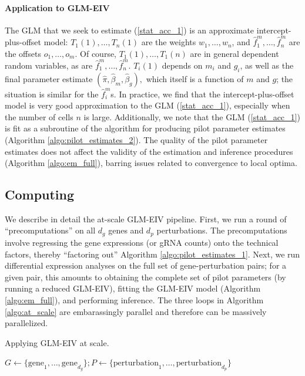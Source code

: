 \documentclass[12pt]{article}
\begin{document}
\begin{appendices}
\begin{refsection}
		\paragraph{Application to GLM-EIV}
		The GLM that we seek to estimate (\ref{stat_acc_1}) is an approximate intercept-plus-offset model: $T_1(1), \dots, T_n(1)$ are the weights $w_1,\dots, w_n$, and $\hat{f}^m_1, \dots, \hat{f}^m_n$ are the offsets $o_1, \dots, o_m$. Of course, $T_1(1), \dots, T_1(n)$ are in general dependent random variables, as are $\hat{f}^m_1, \dots, \hat{f}^m_n.$ $T_i(1)$ depends on $m_i$ and $g_i$, as well as the final parameter estimate $(\hat{\pi}, \hat{\beta}_m, \hat{\beta}_g),$ which itself is a function of $m$ and $g$; the situation is similar for the $\hat{f}^m_i$s. In practice, we find that the intercept-plus-offset model is very good approximation to the GLM (\ref{stat_acc_1}), especially when the number of cells $n$ is large. Additionally, we note that the GLM (\ref{stat_acc_1}) is fit as a subroutine of the algorithm for producing pilot parameter estimates (Algorithm \ref{algo:pilot_estimates_2}). The quality of the pilot parameter estimates does not affect the validity of the estimation and inference procedures (Algorithm \ref{algo:em_full}), barring issues related to convergence to local optima.
		
\subsection{Computing}\label{sec:computing}

We describe in detail the at-scale GLM-EIV pipeline. First, we run a round of ``precomputations'' on all $d_g$ genes and $d_p$ perturbations. The precomputations involve regressing the gene expressions (or gRNA counts) onto the technical factors, thereby ``factoring out'' Algorithm \ref{algo:pilot_estimates_1}. Next, we run differential expression analyses on the full set of gene-perturbation pairs; for a given pair, this amounts to obtaining the complete set of pilot parameters (by running a reduced GLM-EIV), fitting the GLM-EIV model (Algorithm \ref{algo:em_full}), and performing inference. The three loops in Algorithm \ref{algo:at_scale} are embarassingly parallel and therefore can be massively parallelized. 

\begin{algorithm}
	\caption{Applying GLM-EIV at scale.}\label{algo:at_scale}
	\begin{algorithmic}
		\State $G \gets \{\textrm{gene}_1, \dots, \textrm{gene}_{d_g}\}; P \gets \{\textrm{perturbation}_1, \dots, \textrm{perturbation}_{d_p}\}$
		

\end{algorithmic}
\end{algorithm}
\end{refsection}
\end{appendices}
\end{document}
